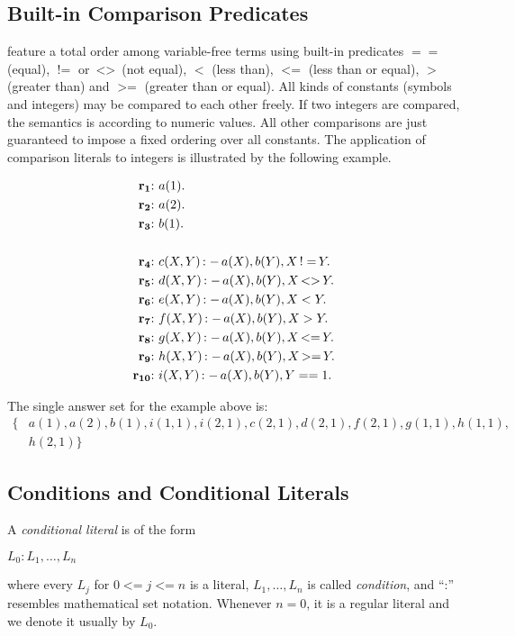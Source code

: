 \documentclass[a4paper, titlepage]{article}
\DeclareMathOperator{\leftimpl}{:-}
\DeclareMathOperator{\noteq}{!=}
\DeclareMathOperator{\noteqq}{<>}
\DeclareMathOperator{\lesseq}{<=}
\DeclareMathOperator{\geeq}{>=}
\newcommand\mycenterline[1]{\par\smallskip\centerline{#1} \smallskip}
\newcommand{\rowprefix}[1]{%
  \ensuremath{\color{black}\mathbf{#1{:}}\ }%
}
\begin{document}
\subsection{Built-in Comparison Predicates}
\dlvhex{} feature a total order among variable-free terms 
using built-in predicates $==$ (equal), $\noteq$ or $\noteqq$ (not equal), 
$<$ (less than), $\lesseq$ (less than or equal), $>$ (greater 
than) and $\geeq$ (greater than or equal). All kinds of 
constants (symbols and integers) may be compared to 
each other freely. If two integers are compared, the 
semantics is according to numeric values. All other 
comparisons are just guaranteed to impose a fixed ordering 
over all constants. The application of comparison literals 
to integers is illustrated by the following example.
\begin{exmp}
\begin{align*}
\rowprefix{r_1}& a(1). \\
\rowprefix{r_2}& a(2). \\
\rowprefix{r_3}& b(1). \\
\\
\rowprefix{r_4}& c(X,Y) \leftimpl a(X), b(Y), X \noteq Y. \\
\rowprefix{r_5}& d(X,Y) \leftimpl a(X), b(Y), X \noteqq Y. \\
\rowprefix{r_6}& e(X,Y) \leftimpl a(X), b(Y), X < Y. \\
\rowprefix{r_7}& f(X,Y) \leftimpl a(X), b(Y), X > Y. \\
\rowprefix{r_8}& g(X,Y) \leftimpl a(X), b(Y), X \lesseq Y. \\
\rowprefix{r_9}& h(X,Y) \leftimpl a(X), b(Y), X \geeq Y. \\
\rowprefix{r_{10}}& i(X,Y) \leftimpl a(X), b(Y), Y == 1. 
\end{align*}
\end{exmp}
The single answer set for the example above is:
\begin{align*}
\{ & \mathit{a(1),a(2),b(1),i(1,1),i(2,1),c(2,1),d(2,1),f(2,1),g(1,1),h(1,1)},\\
   & \mathit{h(2,1)}\}
\end{align*}

\subsection{Conditions and Conditional Literals}
\label{conditions}
A \emph{conditional literal} is of the form 
\mycenterline{$L_0:L_1,\dots,L_n$} where every $\mathit{L_j}$ 
for $0 \lesseq j \lesseq n$ is a literal, $L_1,\dots,L_n$ is 
called \emph{condition}, and \enquote{:} resembles 
mathematical set notation. Whenever $\mathit{n = 0}$, it is 
a regular literal and we denote it usually by $L_0$.
\end{document}

